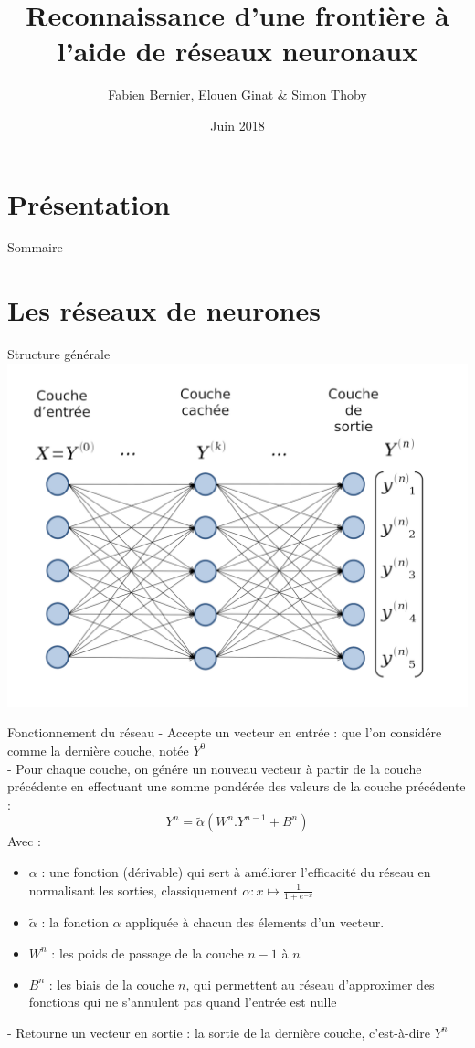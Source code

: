 \documentclass[ignorenonframetext,]{beamer}
\title{Reconnaissance d'une frontière à l'aide de réseaux neuronaux}
\author{Fabien Bernier, Elouen Ginat \& Simon Thoby}
\date{Juin 2018}
\begin{document}
\section*{Présentation}
\frame{\titlepage}

\begin{frame}{Sommaire}
\tableofcontents
\end{frame}

\section{Les réseaux de neurones}
\frame{\sectionpage}
\begin{frame}{Structure générale}
	\includegraphics{net-without-train.png}
\end{frame}

\begin{frame}{Fonctionnement du réseau}
    - Accepte un vecteur en entrée : que l'on considére comme la dernière couche, notée $ Y^0 $ \\
    - Pour chaque couche, on génére un nouveau vecteur à partir de la couche précédente en effectuant une somme pondérée des valeurs de la couche précédente : \[ Y^n = \tilde\alpha(W^n . Y^{n-1} + B^n) \]
        Avec :
    \begin{itemize}
        \item $ \alpha $ : une fonction (dérivable) qui sert à améliorer l'efficacité du réseau en normalisant les sorties, classiquement $ \alpha : x \mapsto \frac{1}{1+e^{-x}} $
        \item $\tilde\alpha$ : la fonction $\alpha$ appliquée à chacun des élements d'un vecteur.
        \item $ W^n $ : les poids de passage de la couche $ n-1 $ à $ n $
        \item $ B^n $ : les biais de la couche $ n $, qui permettent au réseau d'approximer des fonctions qui ne s'annulent pas quand l'entrée est nulle
    \end{itemize}
    - Retourne un vecteur en sortie : la sortie de la dernière couche, c'est-à-dire $ Y^n $
\end{frame}
\end{document}
